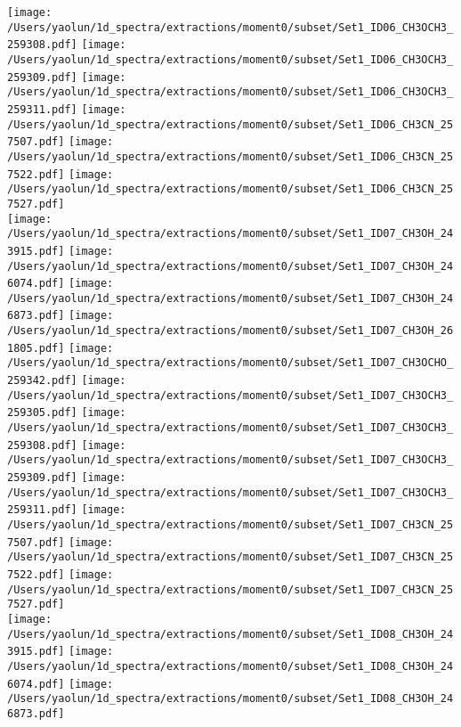 \begin{figure*}[htbp!]
  \texttt{[image: /Users/yaolun/1d\_spectra/extractions/moment0/subset/Set1\_ID06\_CH3OCH3\_259308.pdf]}
  \texttt{[image: /Users/yaolun/1d\_spectra/extractions/moment0/subset/Set1\_ID06\_CH3OCH3\_259309.pdf]}
  \texttt{[image: /Users/yaolun/1d\_spectra/extractions/moment0/subset/Set1\_ID06\_CH3OCH3\_259311.pdf]}
  \texttt{[image: /Users/yaolun/1d\_spectra/extractions/moment0/subset/Set1\_ID06\_CH3CN\_257507.pdf]}
  \texttt{[image: /Users/yaolun/1d\_spectra/extractions/moment0/subset/Set1\_ID06\_CH3CN\_257522.pdf]}
  \texttt{[image: /Users/yaolun/1d\_spectra/extractions/moment0/subset/Set1\_ID06\_CH3CN\_257527.pdf]}
  \\
  \texttt{[image: /Users/yaolun/1d\_spectra/extractions/moment0/subset/Set1\_ID07\_CH3OH\_243915.pdf]}
  \texttt{[image: /Users/yaolun/1d\_spectra/extractions/moment0/subset/Set1\_ID07\_CH3OH\_246074.pdf]}
  \texttt{[image: /Users/yaolun/1d\_spectra/extractions/moment0/subset/Set1\_ID07\_CH3OH\_246873.pdf]}
  \texttt{[image: /Users/yaolun/1d\_spectra/extractions/moment0/subset/Set1\_ID07\_CH3OH\_261805.pdf]}
  \texttt{[image: /Users/yaolun/1d\_spectra/extractions/moment0/subset/Set1\_ID07\_CH3OCHO\_259342.pdf]}
  \texttt{[image: /Users/yaolun/1d\_spectra/extractions/moment0/subset/Set1\_ID07\_CH3OCH3\_259305.pdf]}
  \texttt{[image: /Users/yaolun/1d\_spectra/extractions/moment0/subset/Set1\_ID07\_CH3OCH3\_259308.pdf]}
  \texttt{[image: /Users/yaolun/1d\_spectra/extractions/moment0/subset/Set1\_ID07\_CH3OCH3\_259309.pdf]}
  \texttt{[image: /Users/yaolun/1d\_spectra/extractions/moment0/subset/Set1\_ID07\_CH3OCH3\_259311.pdf]}
  \texttt{[image: /Users/yaolun/1d\_spectra/extractions/moment0/subset/Set1\_ID07\_CH3CN\_257507.pdf]}
  \texttt{[image: /Users/yaolun/1d\_spectra/extractions/moment0/subset/Set1\_ID07\_CH3CN\_257522.pdf]}
  \texttt{[image: /Users/yaolun/1d\_spectra/extractions/moment0/subset/Set1\_ID07\_CH3CN\_257527.pdf]}
  \\
  \texttt{[image: /Users/yaolun/1d\_spectra/extractions/moment0/subset/Set1\_ID08\_CH3OH\_243915.pdf]}
  \texttt{[image: /Users/yaolun/1d\_spectra/extractions/moment0/subset/Set1\_ID08\_CH3OH\_246074.pdf]}
  \texttt{[image: /Users/yaolun/1d\_spectra/extractions/moment0/subset/Set1\_ID08\_CH3OH\_246873.pdf]}

\end{figure*}
